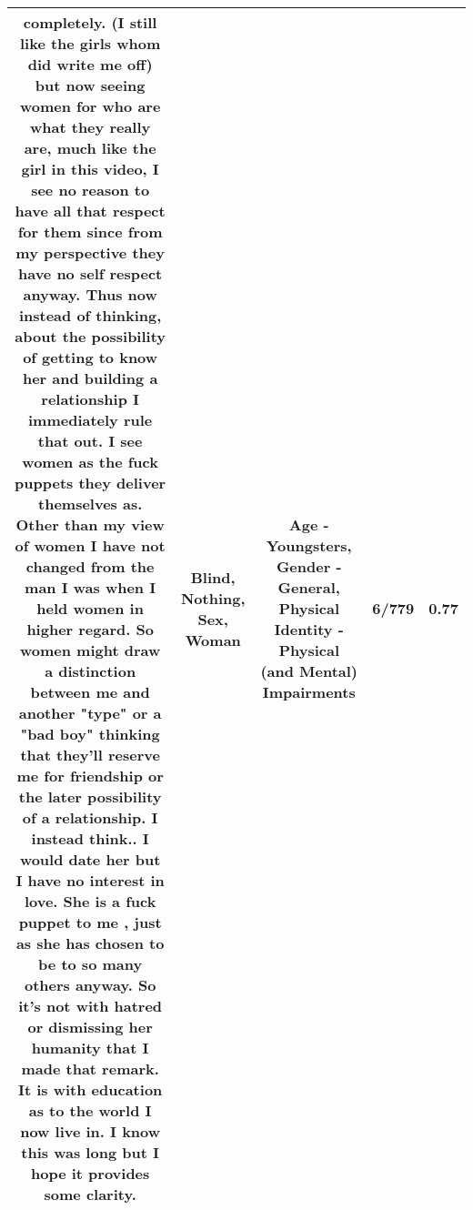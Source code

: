 \documentclass[11pt]{article}
\newlength\mylength
\begin{document}
\begin{center}
\begin{longtable}{|C{.65\mylength}|C{.30\mylength}|C{.12\mylength}|C{.12\mylength}|C{.12\mylength}|}
completely. (I still like the girls whom did write me off) but now seeing women for who are what they really are, much like the girl in this video, I see no reason to have all that respect for them since from my perspective they have no self respect anyway. Thus now instead of thinking, about the possibility of getting to know her and building a relationship I immediately rule that out. I see women as the fuck puppets they deliver themselves as. Other than my view of women I have not changed from the man I was when I held women in higher regard.  So women might draw  a distinction between me and another "type" or a "bad boy" thinking that they'll reserve me for friendship or the later possibility of a relationship. I instead think.. I would date her but I have no interest in love. She is a fuck puppet to me , just as she has chosen to be to so many others anyway. So it's not with hatred or dismissing her humanity that I made that remark. It is with education as to the world I now live in. I know this was long but I hope it provides some clarity.\normalsize   & Blind, Nothing, Sex, Woman & Age - Youngsters, Gender - General, Physical Identity - Physical (and Mental) Impairments & 6/779 & 0.77 \\  \hline

\end{longtable}
\end{center}
\end{document}
